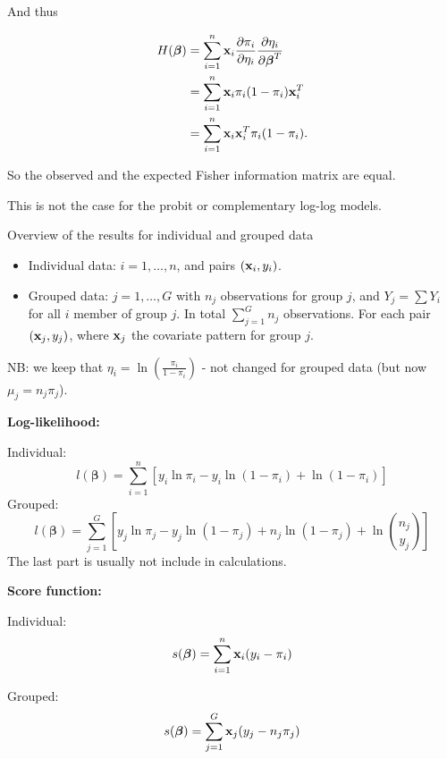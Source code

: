 \documentclass[
  ignorenonframetext,
]{beamer}
\providecommand{\tightlist}{%
  \setlength{\itemsep}{0pt}\setlength{\parskip}{0pt}}
\begin{document}
\begin{frame}
And thus

\[
\begin{aligned}
H(\boldsymbol{\beta}) &=\sum_{i=1}^n {\bf x}_i \frac{\partial \pi_i}{\partial \eta_i} \frac{\partial \eta_i}{\partial \boldsymbol{\beta}^T} \\
&=\sum_{i=1}^n {\bf x}_i\pi_i(1-\pi_i) {\bf x}_i^T\\
&= \sum_{i=1}^n {\bf x}_i{\bf x}_i^T \pi_i(1-\pi_i).
\end{aligned}
\]

So the observed and the expected Fisher information matrix are equal.

This is not the case for the probit or complementary log-log models.
\end{frame}

\begin{frame}
\begin{block}{Overview of the results for individual and grouped data}
\protect\hypertarget{overview-of-the-results-for-individual-and-grouped-data}{}
\begin{itemize}
\tightlist
\item
  Individual data: \(i=1,\ldots, n\), and pairs \(({\bf x}_i,y_i)\).
\item
  Grouped data: \(j=1,\ldots, G\) with \(n_j\) observations for group
  \(j\), and \(Y_j=\sum Y_i\) for all \(i\) member of group \(j\). In
  total \(\sum_{j=1}^G n_j\) observations. For each pair
  \(({\bf x}_j, y_j)\), where \({\bf x}_j\) the covariate pattern for
  group \(j\).
\end{itemize}

NB: we keep that \(\eta_i=\ln (\frac{\pi_i}{1-\pi_i})\) - not changed
for grouped data (but now \(\mu_j=n_j\pi_j\)).
\end{block}
\end{frame}

\begin{frame}
\textbf{Log-likelihood:}

Individual:
\[l(\boldsymbol{\beta})=\sum_{i=1}^n[y_i \ln \pi_i-y_i\ln(1-\pi_i)+\ln(1-\pi_i)]\]
Grouped:
\[l(\boldsymbol{\beta})=\sum_{j=1}^G[y_j \ln \pi_j-y_j\ln(1-\pi_j)+n_j\ln(1-\pi_j)+ \ln {n_j \choose y_j}]\]
The last part is usually not include in calculations.
\end{frame}

\begin{frame}
\textbf{Score function:}

Individual: \[s(\boldsymbol{\beta})=\sum_{i=1}^n {\bf x}_i (y_i-\pi_i)\]

Grouped: \[s(\boldsymbol{\beta})=\sum_{j=1}^G {\bf x}_j (y_j-n_j\pi_j)\]
\end{frame}
\end{document}
